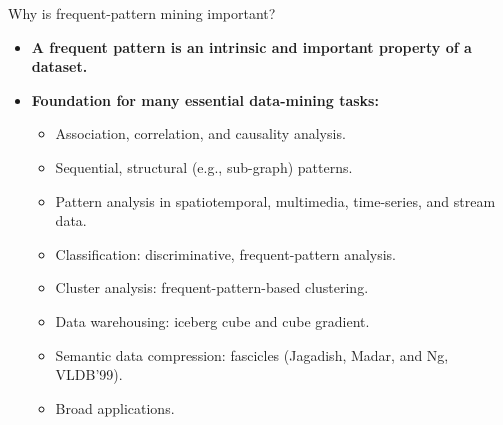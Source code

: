 \documentclass[aspectratio=169,t]{beamer}
\begin{document}
  { 
    \begin{frame}{Why is frequent-pattern mining important?}
        \begin{itemize}
            \item \textbf{A frequent pattern is an intrinsic and important property of a dataset.}
            \item \textbf{Foundation for many essential data-mining tasks:}
            \begin{itemize}
              \item Association, correlation, and causality analysis.
              \item Sequential, structural (e.g., sub-graph) patterns.
              \item Pattern analysis in spatiotemporal, multimedia, time-series, and stream data.
              \item Classification: discriminative, frequent-pattern analysis.
              \item Cluster analysis: frequent-pattern-based clustering.
              \item Data warehousing: iceberg cube and cube gradient.
              \item Semantic data compression: fascicles (Jagadish, Madar, and Ng, VLDB'99).
              \item Broad applications.
            \end{itemize}
        \end{itemize}
    \end{frame}
  }
\end{document}
